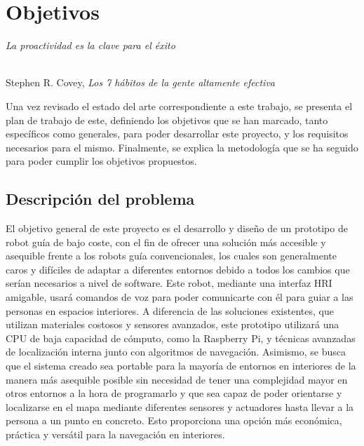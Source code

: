 \chapter{Objetivos}
\label{cap:capitulo3}

\begin{flushright}
\begin{minipage}[]{10cm}
\emph{La proactividad es la clave para el éxito}\\
\end{minipage}\\

Stephen R. Covey, \textit{Los 7 hábitos de la gente altamente efectiva}\\
\end{flushright}

\vspace{1cm}

Una vez revisado el estado del arte correspondiente a este trabajo, se presenta el plan de trabajo de este, definiendo los 
objetivos que se han marcado, tanto específicos como generales, para poder desarrollar este proyecto, y los requisitos necesarios para el mismo.
Finalmente, se explica la metodología que se ha seguido para poder cumplir los objetivos propuestos.\\



\section{Descripción del problema}
\label{sec:descripcion}

\vspace{0.7cm}
El objetivo general de este proyecto es el desarrollo y diseño de un prototipo de robot guía de bajo coste, con el fin de ofrecer una solución más accesible y asequible frente a los robots guía convencionales, los cuales son generalmente caros y difíciles de adaptar a diferentes entornos debido a todos los cambios que serían necesarios a nivel de software. Este robot, mediante una interfaz HRI amigable, usará comandos de voz para poder comunicarte con él para guiar a las personas en espacios interiores. A diferencia de las soluciones existentes, que utilizan materiales costosos y sensores avanzados, este prototipo utilizará una CPU de baja capacidad de cómputo, como la Raspberry Pi, y técnicas avanzadas de localización interna  junto con algoritmos de navegación. Asimismo, se busca que el sistema creado sea portable para la mayoría de entornos en interiores de la manera más asequible posible sin necesidad de 
tener una complejidad mayor en otros entornos a la hora de programarlo y que sea capaz de poder orientarse y localizarse en el mapa mediante diferentes sensores y actuadores hasta llevar a la persona a un punto en concreto. Esto proporciona una opción más económica, práctica y versátil para la navegación en interiores.\\ 

